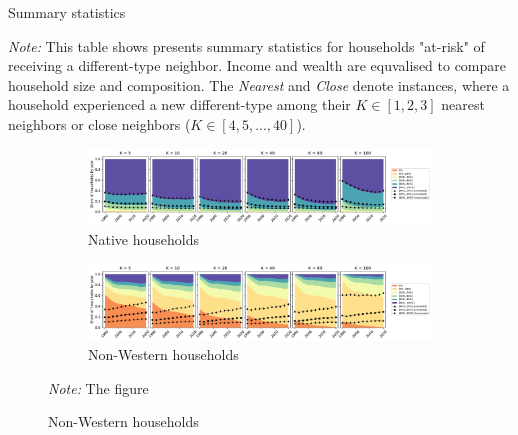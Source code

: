\documentclass[main.tex]{subfiles}
\begin{document}
\begin{table}[H]
    \centering
    \caption{Summary statistics}
    \resizebox{\textwidth}{!}{}
    \label{tab:descriptives_native_and_non_west}
\begin{tablenotes}[flushleft]
\item \small \textit{Note:} This table shows presents summary statistics for households "at-risk" of receiving a different-type neighbor. Income and wealth are equvalised to compare household size and composition. The \textit{Nearest} and \textit{Close} denote instances, where a household experienced a new different-type among their $K\in [1,2,3]$ nearest neighbors or close neighbors ($K\in [4, 5, ...,40]$).
\end{tablenotes}
    
\end{table}

\begin{landscape}
\begin{figure}
      \centering
    \caption{Temporal development of K-nearest neighbors}
    
    \begin{subfigure}{1.5\textwidth}
    \includegraphics[width=\linewidth]{figs/temporal_knn_native_1990_2020_w_sim.pdf}
    \caption{Native households}
    \label{fig:temporal_knn_native_1990_2020}
    \end{subfigure}	
    \begin{subfigure}{1.5\textwidth}
    \includegraphics[width=\linewidth]{figs/temporal_knn_non_west_1990_2020_w_sim.pdf}
    \caption{Non-Western households}
    \label{fig:temporal_knn_native_1990_2020}
    \end{subfigure}	
\begin{tablenotes}
\item \footnotesize \textit{Note:} The figure \end{tablenotes}
\end{figure}
\end{landscape}
\end{document}
